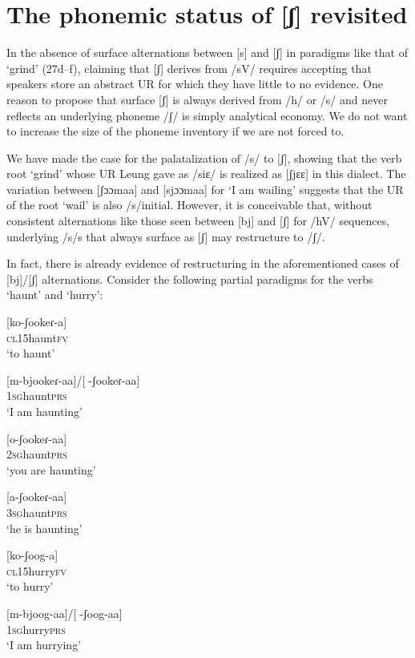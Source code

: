 \documentclass[output=paper]{langsci/langscibook}
\begin{document}
\section{The phonemic status of [ʃ] revisited}

In the absence of surface alternations between [s] and [ʃ] in paradigms like that of ‘grind’ (27d–f), claiming that [ʃ] derives from /sV/ requires accepting that speakers store an abstract UR for which they have little to no evidence. One reason to propose that surface [ʃ] is always derived from /h/ or /s/ and never reflects an underlying phoneme /ʃ/ is simply analytical economy. We do not want to increase the size of the phoneme inventory if we are not forced to.

We have made the case for the palatalization of /s/ to [ʃ], showing that the verb root ‘grind’ whose UR Leung gave as /siɛ/ is realized as [ʃjɛɛ] in this dialect. The variation between [ʃɔɔmaa] and [sjɔɔmaa] for ‘I am wailing’ suggests that the UR of the root ‘wail’ is also /s/initial. However, it is conceivable that, without consistent alternations like those seen between [bj] and [ʃ] for /hV/ sequences, underlying /s/s that always surface as [ʃ] may restructure to /ʃ/. 

In fact, there is already evidence of restructuring in the aforementioned cases of [bj]/[ʃ] alternations. Consider the following partial paradigms for the verbs ‘haunt’ and ‘hurry’:



\ea{}
 [ko-ʃookeɾ-a]\\{}
\textsc{cl15}haunt\textsc{fv}\\{}
\glt ‘to haunt’
\z


\ea{}
 [m-bjookeɾ-aa]/[-ʃookeɾ-aa]\\{}
\textsc{1sg}haunt\textsc{prs}\\{}
\glt ‘I am haunting’
\z


\ea{}
 [o-ʃookeɾ-aa]\\{}
\textsc{2sg}haunt\textsc{prs}\\{}
\glt ‘you are haunting’
\z


\ea{}
 [a-ʃookeɾ-aa]\\{}
\textsc{3sg}haunt\textsc{prs}\\{}
\glt ‘he is haunting’
\z


\ea{}
 [ko-ʃoog-a]\\{}
\textsc{cl15}hurry\textsc{fv}\\{}
\glt ‘to hurry’
\z


\ea{}
 [m-bjoog-aa]/[-ʃoog-aa]\\{}
\textsc{1sg}hurry\textsc{prs}\\{}
\glt ‘I am hurrying’
\z
\end{document}
